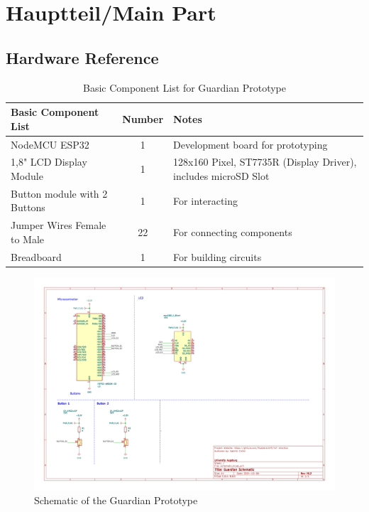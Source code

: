 \chapter{Hauptteil/Main Part}

\section{Hardware Reference}

\begin{table}[h!]
    \centering
    \begin{tabular}{|l|c|p{5cm}|}
        \hline
        \textbf{Basic Component List} & \textbf{Number} & \textbf{Notes} \\
        \hline
        NodeMCU ESP32  & 1 & Development board for prototyping \\
        \hline
        1,8" LCD Display Module  & 1 & 128x160 Pixel, ST7735R (Display Driver), includes microSD Slot \\
        \hline
        Button module with 2 Buttons & 1 & For interacting \\
        \hline
		Jumper Wires Female to Male & 22 & For connecting components \\
        \hline
        Breadboard & 1 & For building circuits \\
        \hline
    \end{tabular}
    \caption{Basic Component List for Guardian Prototype}
    \label{tab:basic-component-list}
\end{table}

\begin{figure}
	\centering
	\includegraphics[scale=.5]{abbildungen/schematic.png}
	\caption{Schematic of the Guardian Prototype}
	\label{Fig:schematic}
\end{figure}


